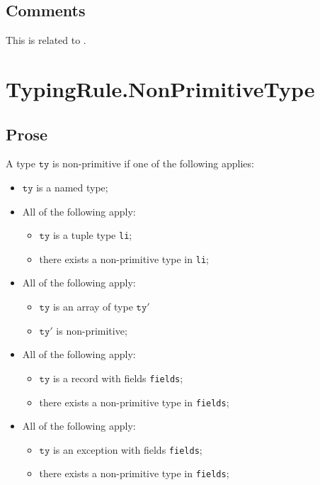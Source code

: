 \documentclass{book}
\newcommand\tty[0]{\texttt{ty}}
\begin{document}
    \subsection{Comments}
    This is related to .

\newcommand\vtp[0]{\texttt{t}'}

\section{TypingRule.NonPrimitiveType}

    \subsection{Prose} 
    A type $\tty$ is non-primitive if one of the following applies:
    \begin{itemize}
    \item $\tty$ is a named type;
    \item All of the following apply:
      \begin{itemize}
      \item $\tty$ is a tuple type \texttt{li};
      \item there exists a non-primitive type in \texttt{li};
      \end{itemize}
    \item All of the following apply:
      \begin{itemize}
      \item $\tty$ is an array of type $\tty'$
      \item $\tty'$ is non-primitive; 
      \end{itemize}
    \item All of the following apply:
      \begin{itemize}
      \item $\tty$ is a record with fields \texttt{fields};
      \item there exists a non-primitive type in \texttt{fields};
      \end{itemize}
    \item All of the following apply:
      \begin{itemize}
      \item $\tty$ is an exception with fields \texttt{fields};
      \item there exists a non-primitive type in \texttt{fields};
      \end{itemize}
    \end{itemize}
\end{document}
